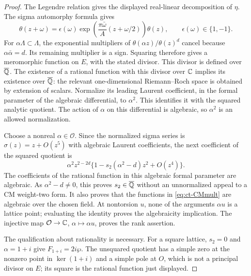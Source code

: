 \begin{proof}
The Legendre relation gives the displayed real-linear decomposition
of $\eta$. The sigma automorphy formula gives
\[
 \theta(z+\omega)=\epsilon(\omega)
  \exp\left(\frac{\pi\bar\omega}{A}
                         (z+\omega/2)\right)\theta(z),
 \qquad \epsilon(\omega)\in\{1,-1\}.
\]
For $\alpha\Lambda\subset\Lambda$, the exponential multipliers
of $\theta(\alpha z)/\theta(z)^d$ cancel because
$\alpha\bar\alpha=d$. Its remaining multiplier is a sign.
Squaring therefore gives a meromorphic function on $E$, with the
stated divisor. This divisor is defined over $\overline{\mathbb Q}$.
The existence of a rational function with this divisor over $\mathbb C$
implies its existence over $\overline{\mathbb Q}$: the relevant
one-dimensional Riemann--Roch space is obtained by extension of
scalars. Normalize its leading Laurent coefficient, in the formal
parameter of the algebraic differential, to $\alpha^2$. This
identifies it with the squared analytic quotient. The action of
$\alpha$ on this differential is algebraic, so $\alpha^2$ is an
allowed normalization.

Choose a nonreal $\alpha\in\mathcal O$. Since the normalized
sigma series is $\sigma(z)=z+O(z^5)$ with algebraic Laurent
coefficients, the next coefficient of the squared quotient is
\[
 \alpha^2z^{2-2d}
       \{1-s_2(\alpha^2-d)z^2+O(z^4)\}.
\]
The coefficients of the rational function in this algebraic formal
parameter are algebraic. As $\alpha^2-d\ne0$, this proves
$s_2\in\overline{\mathbb Q}$ without an unnormalized appeal to a CM
weight-two form. It also proves that the functions in
\eqref{eq:ct-CMmult} are algebraic over the chosen field.
At nontorsion $u$, none of the arguments $\alpha u$ is a lattice
point; evaluating the identity proves the algebraicity implication.
The injective map $\mathcal O\to\mathbb C$, $\alpha\mapsto\alpha u$,
proves the rank assertion.

The qualification about rationality is necessary. For a square
lattice, $s_2=0$ and $\alpha=1+i$ give
$F_{1+i}=2i\wp$. The unsquared quotient has a simple zero at
the nonzero point in $\ker(1+i)$ and a simple pole at $O$,
which is not a principal divisor on $E$; its square is the
rational function just displayed.
\end{proof}

